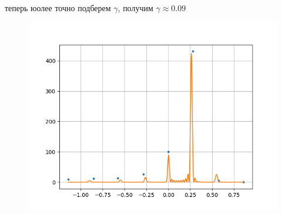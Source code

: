 теперь юолее точно подберем $\gamma$, получим $\gamma \approx 0.09$ 
\begin{figure}[h]
    \centering
    \includegraphics[trim={0 0 0 0},clip,width=\textwidth]{Ex_2/ex_2_approx.png}
    \caption{}
    \label{Task_1_1}
\end{figure}

